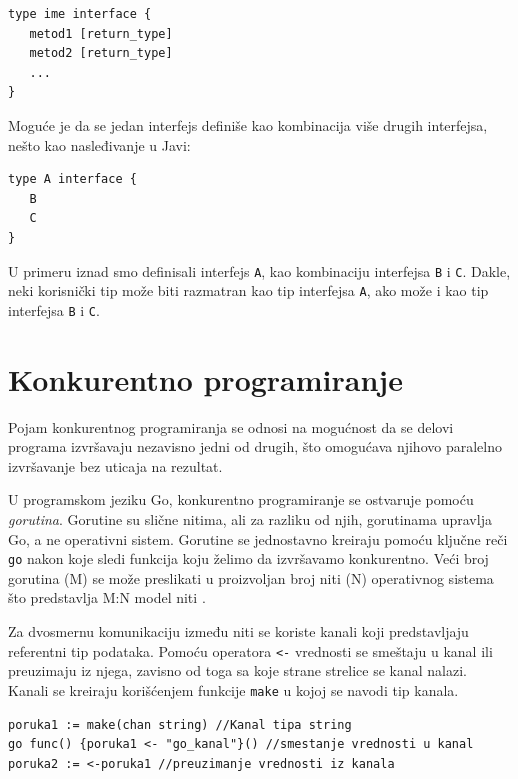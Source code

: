 \documentclass[a4paper]{article}
\begin{document}
\begin{lstlisting}[caption={Primer interfejsa},frame=single, label=Primer_interfejsa]
type ime interface {
   metod1 [return_type]
   metod2 [return_type]
   ...
}
\end{lstlisting}

Moguće je da se jedan interfejs definiše kao kombinacija više drugih interfejsa, nešto kao nasleđivanje u Javi:

\begin{lstlisting}[caption={Primer interfejsa definisanog preko drugih interfejsa},frame=single, label=Primer_interfejsa_definisanog_preko_drugih_interfejsa]
type A interface {
   B
   C
}
\end{lstlisting}

U primeru iznad smo definisali interfejs \texttt{A}, kao kombinaciju interfejsa \texttt{B} i \texttt{C}. Dakle, neki korisnički tip može biti razmatran kao tip interfejsa \texttt{A}, ako može i kao tip interfejsa \texttt{B} i \texttt{C}.





\section{Konkurentno programiranje}	
\label{sec:Konkurentno programiranje}

Pojam konkurentnog programiranja se odnosi na mogućnost da se delovi programa izvršavaju nezavisno jedni od drugih, što omogućava njihovo paralelno izvršavanje bez uticaja na rezultat.

U programskom jeziku Go, konkurentno programiranje se ostvaruje pomoću \textit{gorutina}. Gorutine su slične nitima, ali za razliku od njih, gorutinama upravlja Go, a ne operativni sistem. Gorutine se jednostavno kreiraju pomoću ključne reči \texttt{go} nakon koje sledi funkcija koju želimo da izvršavamo konkurentno. Veći broj gorutina (M) se može preslikati u proizvoljan broj niti (N) operativnog sistema što predstavlja M:N model niti \cite{OperativniSistemi}.

Za dvosmernu komunikaciju između niti se koriste kanali koji predstavljaju referentni tip podataka. Pomoću operatora \texttt{<-} vrednosti se smeštaju u kanal ili preuzimaju iz njega, zavisno od toga sa koje strane strelice se kanal nalazi. Kanali se kreiraju korišćenjem funkcije \texttt{make} u kojoj se navodi tip kanala.

\begin{lstlisting}[caption={Kreiranje kanala},frame=single, label=Kreiranje_kanala]
poruka1 := make(chan string) //Kanal tipa string
go func() {poruka1 <- "go_kanal"}() //smestanje vrednosti u kanal
poruka2 := <-poruka1 //preuzimanje vrednosti iz kanala
\end{lstlisting}
\end{document}
